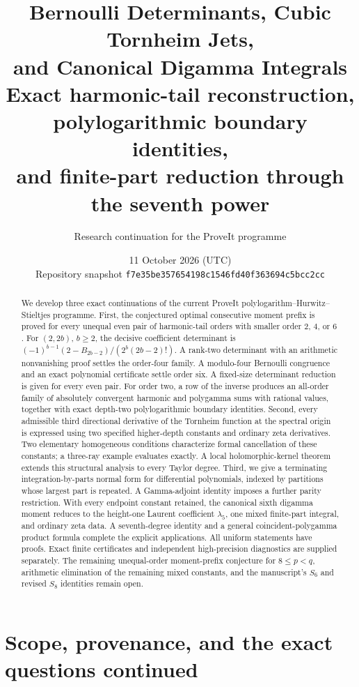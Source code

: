 \documentclass[11pt,a4paper]{article}
\title{\textbf{Bernoulli Determinants, Cubic Tornheim Jets,\\and Canonical Digamma Integrals}\\[8pt]
\large Exact harmonic-tail reconstruction, polylogarithmic boundary identities,\\
and finite-part reduction through the seventh power}
\author{Research continuation for the ProveIt programme}
\date{11 October 2026 (UTC)\\[4pt]
\small Repository snapshot \texttt{f7e35be357654198c1546fd40f363694c5bcc2cc}}
\numberwithin{equation}{section}
\theoremstyle{plain}
\theoremstyle{definition}
\theoremstyle{remark}
\begin{document}
\maketitle
\begin{abstract}
We develop three exact continuations of the current ProveIt
polylogarithm--Hurwitz--Stieltjes programme. First, the conjectured
optimal consecutive moment prefix is proved for every unequal even pair
of harmonic-tail orders with smaller order $2$, $4$, or $6$. For $(2,2b)$,
$b\ge2$, the decisive coefficient determinant is
$(-1)^{b-1}(2-B_{2b-2})/(2^b(2b-2)!)$. A rank-two determinant with an arithmetic nonvanishing proof settles the
order-four family. A modulo-four Bernoulli congruence and an exact
polynomial certificate settle order six. A fixed-size determinant reduction is given
for every even pair. For order two, a row of the inverse
produces an all-order family of absolutely convergent harmonic and
polygamma sums with rational values, together with exact depth-two
polylogarithmic boundary identities. Second, every admissible third directional
derivative of the Tornheim function at the spectral origin is expressed
using two specified higher-depth constants and ordinary zeta derivatives.
Two elementary homogeneous conditions characterize formal cancellation
of these constants; a three-ray example evaluates exactly. A local
holomorphic-kernel theorem extends this structural analysis to every
Taylor degree. Third, we give a terminating integration-by-parts normal
form for differential polynomials, indexed by partitions whose largest
part is repeated. A Gamma-adjoint identity imposes a further parity
restriction. With every endpoint constant retained, the canonical sixth
digamma moment reduces to the height-one Laurent coefficient
$\lambda_5$, one mixed finite-part integral, and ordinary zeta data.
A seventh-degree identity and a general coincident-polygamma product
formula complete the explicit applications. All uniform statements have proofs. Exact finite certificates and
independent high-precision diagnostics are supplied separately. The
remaining unequal-order moment-prefix conjecture for $8\le p<q$, arithmetic elimination
of the remaining mixed constants, and the manuscript's $S_6$ and revised
$S_8$ identities remain open.
\end{abstract}
\clearpage
\begingroup
\small
\setlength{\parskip}{0pt}
\tableofcontents
\endgroup
\clearpage

\section{Scope, provenance, and the exact questions continued}
\label{sec:scope}
\end{document}
